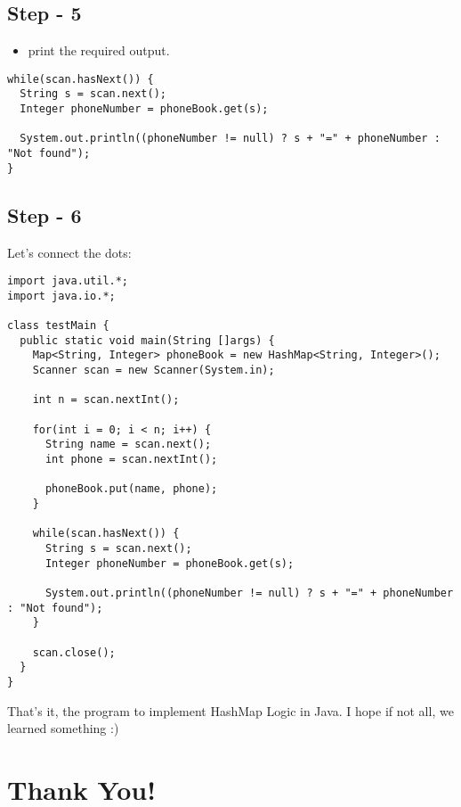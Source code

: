 \documentclass[11pt]{article}
\begin{document}
\subsection{Step - 5}
\label{sec:org8f0dde7}

\begin{itemize}
\item print the required output.
\end{itemize}

\begin{verbatim}
while(scan.hasNext()) {
  String s = scan.next();
  Integer phoneNumber = phoneBook.get(s);

  System.out.println((phoneNumber != null) ? s + "=" + phoneNumber : "Not found");
}
\end{verbatim}

\subsection{Step - 6}
\label{sec:org271ecce}

Let’s connect the dots:

\begin{verbatim}
import java.util.*;
import java.io.*;

class testMain {
  public static void main(String []args) {
    Map<String, Integer> phoneBook = new HashMap<String, Integer>();
    Scanner scan = new Scanner(System.in);

    int n = scan.nextInt();

    for(int i = 0; i < n; i++) {
      String name = scan.next();
      int phone = scan.nextInt();

      phoneBook.put(name, phone);
    }

    while(scan.hasNext()) {
      String s = scan.next();
      Integer phoneNumber = phoneBook.get(s);

      System.out.println((phoneNumber != null) ? s + "=" + phoneNumber : "Not found");
    }

    scan.close();
  }
}
\end{verbatim}

That’s it, the program to implement HashMap Logic in Java. I hope if not all,
we learned something :)

\section{Thank You!}
\label{sec:org34c8c02}
\end{document}
